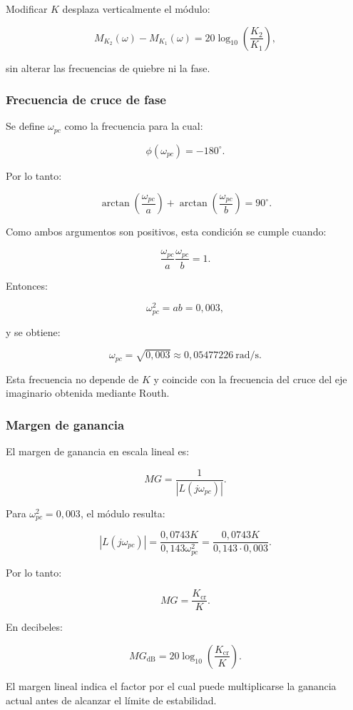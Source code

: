 \documentclass[12pt,a4paper]{article}
\begin{document}
Modificar $K$ desplaza verticalmente el módulo:

\[
M_{K_2}(\omega)
-
M_{K_1}(\omega)
=
20\log_{10}
\left(
\frac{K_2}{K_1}
\right),
\]

sin alterar las frecuencias de quiebre ni la fase.


\subsubsection*{Frecuencia de cruce de fase}

Se define $\omega_{pc}$ como la frecuencia para la cual:

\[
\phi(\omega_{pc})=-180^\circ.
\]

Por lo tanto:

\[
\arctan
\left(
\frac{\omega_{pc}}{a}
\right)
+
\arctan
\left(
\frac{\omega_{pc}}{b}
\right)
=
90^\circ.
\]

Como ambos argumentos son positivos, esta condición
se cumple cuando:

\[
\frac{\omega_{pc}}{a}
\frac{\omega_{pc}}{b}
=
1.
\]

Entonces:

\[
\omega_{pc}^2
=
ab
=
0{,}003,
\]

y se obtiene:

\[
\boxed{
\omega_{pc}
=
\sqrt{0{,}003}
\approx
0{,}05477226\ \mathrm{rad/s}.
}
\]

Esta frecuencia no depende de $K$ y coincide
con la frecuencia del cruce del eje imaginario
obtenida mediante Routh.


\subsubsection*{Margen de ganancia}

El margen de ganancia en escala lineal es:

\[
MG
=
\frac{1}{|L(j\omega_{pc})|}.
\]

Para $\omega_{pc}^2=0{,}003$, el módulo resulta:

\[
|L(j\omega_{pc})|
=
\frac{
0{,}0743K
}{
0{,}143\omega_{pc}^2
}
=
\frac{
0{,}0743K
}{
0{,}143\cdot0{,}003
}.
\]

Por lo tanto:

\[
\boxed{
MG
=
\frac{K_{\mathrm{cr}}}{K}.
}
\]

En decibeles:

\[
\boxed{
MG_{\mathrm{dB}}
=
20\log_{10}
\left(
\frac{K_{\mathrm{cr}}}{K}
\right).
}
\]

El margen lineal indica el factor por el cual puede
multiplicarse la ganancia actual antes de alcanzar
el límite de estabilidad.
\end{document}
